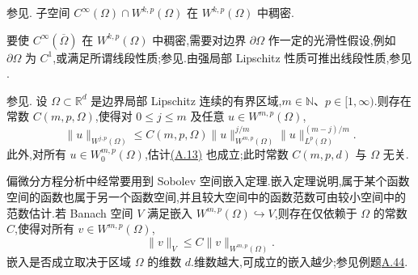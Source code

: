 \begin{theorem}\label{thm:appendix-a-38}
参见\textcite[第 154 页]{GilbargTrudinger1983}.
子空间 $C^\infty(\Omega)\cap W^{k,p}(\Omega)$ 在 $W^{k,p}(\Omega)$ 中稠密.
\end{theorem}

\begin{note}\label{note:appendix-a-39}
要使 $C^\infty(\overline\Omega)$ 在 $W^{k,p}(\Omega)$ 中稠密,需要对边界 $\partial\Omega$ 作一定的光滑性假设,例如 $\partial\Omega$ 为 $C^1$,或满足所谓线段性质;参见\textcite[第 155 页]{GilbargTrudinger1983}.由强局部 Lipschitz 性质可推出线段性质,参见 \textcite[第 67 页]{Adams1975}.
\end{note}

\begin{theorem}\label{thm:appendix-a-40}
参见\textcite[定理 4.17]{Adams1975}.
设 $\Omega\subset\mathbb R^d$ 是边界局部 Lipschitz 连续的有界区域,$m\in\mathbb N$、$p\in[1,\infty)$.则存在常数 $C(m,p,\Omega)$,使得对 $0\le j\le m$ 及任意 $u\in W^{m,p}(\Omega)$,
\begin{equation}\label{eq:appendix-a-13}
 \|u\|_{W^{j,p}(\Omega)}\le C(m,p,\Omega)
 \|u\|_{W^{m,p}(\Omega)}^{j/m}\|u\|_{L^p(\Omega)}^{(m-j)/m}.
\end{equation}
此外,对所有 $u\in W_0^{m,p}(\Omega)$,估计\hyperref[eq:appendix-a-13]{(A.13)} 也成立;此时常数 $C(m,p,d)$ 与 $\Omega$ 无关.
\end{theorem}

\begin{note}[嵌入定理]\label{note:appendix-a-41}
偏微分方程分析中经常要用到 Sobolev 空间嵌入定理.嵌入定理说明,属于某个函数空间的函数也属于另一个函数空间,并且较大空间中的函数范数可由较小空间中的范数估计.若 Banach 空间 $V$ 满足嵌入 $W^{m,p}(\Omega)\hookrightarrow V$,则存在仅依赖于 $\Omega$ 的常数 $C$,使得对所有 $v\in W^{m,p}(\Omega)$,
\[
 \|v\|_V\le C\|v\|_{W^{m,p}(\Omega)}.
\]
嵌入是否成立取决于区域 $\Omega$ 的维数 $d$.维数越大,可成立的嵌入越少;参见例题\hyperref[ex:appendix-a-44]{A.44}.
\end{note}

